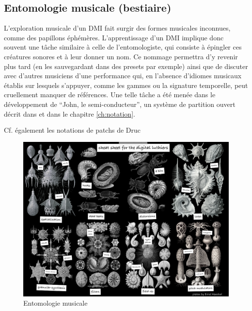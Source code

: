 \subsection{Entomologie musicale (bestiaire)}

\noindent L'exploration musicale d'un \gls{DMI} fait surgir des formes musicales inconnues, comme des papillons éphémères. L'apprentissage d'un \gls{DMI} implique donc souvent une tâche similaire à celle de l'entomologiste, qui consiste à épingler ces créatures sonores et à leur donner un nom. Ce nommage permettra d'y revenir plus tard (en les sauvegardant dans des presets par exemple) ainsi que de discuter avec d'autres musiciens d'une performance qui, en l'absence d'idiomes musicaux établis sur lesquels s'appuyer, comme les gammes ou la signature temporelle, peut cruellement manquer de références. Une telle tâche a été menée dans le développement de ``John, le semi-conducteur'', un système de partition ouvert décrit dans \cite{goudard_john_2018} et dans le chapitre \ref{ch:notation}.\\

Cf. également les notations de patchs de Druc


\begin{figure}[!htbp]
	\captionsetup{format=plain}%
	\includegraphics[width=\textwidth]{gfx/02_ephemeral/Bestiaire.png}
	\caption{Entomologie musicale}
	\label{fig:ephemeral:entomologie}
\end{figure}


